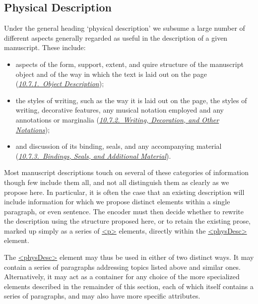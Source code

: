 \subsection[{Physical Description}]{Physical Description}\label{msph}\par
Under the general heading ‘physical description’ we subsume a large number of different aspects generally regarded as useful in the description of a given manuscript. These include: \begin{itemize}
\item aspects of the form, support, extent, and quire structure of the manuscript object and of the way in which the text is laid out on the page (\textit{\hyperref[msph1]{10.7.1.\ Object Description}});
\item the styles of writing, such as the way it is laid out on the page, the styles of writing, decorative features, any musical notation employed and any annotations or marginalia (\textit{\hyperref[msph2]{10.7.2.\ Writing, Decoration, and Other Notations}});
\item and discussion of its binding, seals, and any accompanying material (\textit{\hyperref[msph3]{10.7.3.\ Bindings, Seals, and Additional Material}}).
\end{itemize} \par
Most manuscript descriptions touch on several of these categories of information though few include them all, and not all distinguish them as clearly as we propose here. In particular, it is often the case that an existing description will include information for which we propose distinct elements within a single paragraph, or even sentence. The encoder must then decide whether to rewrite the description using the structure proposed here, or to retain the existing prose, marked up simply as a series of \hyperref[TEI.p]{<p>} elements, directly within the \hyperref[TEI.physDesc]{<physDesc>} element.\par
The \hyperref[TEI.physDesc]{<physDesc>} element may thus be used in either of two distinct ways. It may contain a series of paragraphs addressing topics listed above and similar ones. Alternatively, it may act as a container for any choice of the more specialized elements described in the remainder of this section, each of which itself contains a series of paragraphs, and may also have more specific attributes. \par
